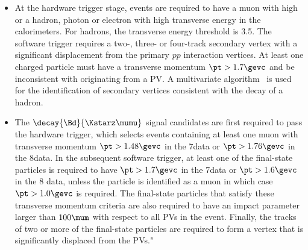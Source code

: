 \begin{itemize}
\item At the hardware trigger stage, events are required to have a muon with high \pt or a
  hadron, photon or electron with high transverse energy in the calorimeters. For hadrons,
  the transverse energy threshold is 3.5\gev.
  The software trigger requires a two-, three- or four-track
  secondary vertex with a significant displacement from the primary
  $pp$ interaction vertices. At least one charged particle
  must have a transverse momentum $\pt > 1.7\gevc$ and be
  inconsistent with originating from a PV.
  A multivariate algorithm~\cite{BBDT} is used for
  the identification of secondary vertices consistent with the decay
  of a \bquark hadron.
\item The $\decay{\Bd}{\Kstarz\mumu}$ signal candidates are first required
      to pass the hardware trigger, which selects events containing at least
      one muon with transverse momentum $\pt>1.48\gevc$ in the 7\tev data or
      $\pt>1.76\gevc$ in the 8\tev data.  In the subsequent software
      trigger, at least one of the final-state particles is required to 
      have $\pt>1.7\gevc$ in the 7\tev data or $\pt>1.6\gevc$ in the 8\tev 
      data, unless the particle is identified as a muon in which case 
      $\pt>1.0\gevc$ is required. The final-state particles that 
      satisfy these transverse momentum criteria are also required 
      to have an impact parameter larger than $100\mum$ with respect 
      to all PVs in the event. Finally, the tracks of two or more of 
      the final-state particles are required to form a vertex that is 
      significantly displaced from the PVs." 

\end{itemize}

